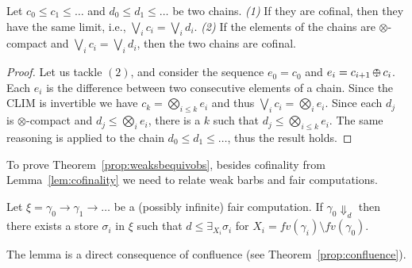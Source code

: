 \documentclass{llncs}
\def\odiv{\, {\ominus\hspace{-7.7pt} \div} \,}
\begin{document}
\begin{lemma}\label{lem:cofinality} 
Let $c_0 \leq c_1 \leq \dots$ and $d_0 \leq d_1 \leq \dots $ be two chains. \emph{(1)} If they are cofinal, then they have the same limit, i.e., $\bigvee_i c_i = \bigvee_i d_i$. \emph{(2)} If the elements of the chains are $\otimes$-compact and $\bigvee_i c_i = \bigvee_i d_i$, then the two chains are cofinal.\end{lemma}
\begin{proof}
Let us tackle $(2)$, and consider the sequence $e_0 = c_0$ and $e_{i} = c_{i+1} \odiv c_i$.
Each $e_i$ is the difference between two consecutive elements of a chain.
%
Since the CLIM is invertible we have $c_k =  \bigotimes_{i \leq k} e_i$ and thus
$\bigvee_i c_i = \bigotimes_i e_i$. Since each $d_j$ is $\otimes$-compact and
$d_j \leq \bigotimes_i e_i$, there is a $k$ such that $d_j \leq \bigotimes_{i \leq k} e_i$.
The same reasoning is applied to the chain $d_0 \leq d_1 \leq \dots $, thus
the result holds.
\end{proof}


To prove Theorem~\ref{prop:weaksbequivobs}, besides cofinality from Lemma~\ref{lem:cofinality} we need to relate weak barbs and fair computations.

\begin{lemma}\label{lem:barbsfair}
Let $\xi = \gamma_0 \longrightarrow \gamma_1 \longrightarrow \ldots$ be a (possibly infinite) fair computation. If $\gamma_0 \Downarrow_d$ then there exists a store $\sigma_i$ in $\xi$ such that $d \leq \exists_{X_i} \sigma_i$ for $X_i = fv(\gamma_i) \setminus fv(\gamma_0)$.
\end{lemma}

The lemma is a direct consequence of confluence (see Theorem~\ref{prop:confluence}).
\end{document}
